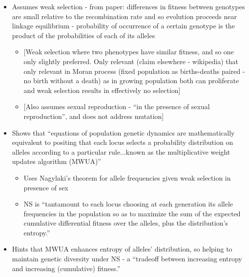 \begin{itemize}
	\item
	
	Assumes weak selection - from paper: differences in fitness between
	genotypes are small relative to the recombination rate and so
	evolution proceeds near linkage equilibrium - probability of
	occurrence of a certain genotype is the product of the probabilities
	of each of its alleles
	
	
	\begin{itemize}
		\item
		
		{[}Weak selection where two phenotypes have similar fitness, and so
		one only slightly preferred. Only relevant (claim elsewhere -
		wikipedia) that only relevant in Moran process (fixed population as
		births-deaths paired - no birth without a death) as in growing
		population both can proliferate and weak selection results in
		effectively no selection{]}
		
		\item
		
		{[}Also assumes sexual reproduction - ``in the presence of sexual
		reproduction'', and does not address mutation{]}
		
	\end{itemize}
	\item
	
	Shows that ``equations of population genetic dynamics are
	mathematically equivalent to positing that each locus selects a
	probability distribution on alleles according to a particular
	rule...known as the multiplicative weight updates algorithm (MWUA)''
	
	
	\begin{itemize}
		\item
		
		Uses Nagylaki's theorem for allele frequencies given weak selection
		in presence of sex
		
		\item
		
		NS is ``tantamount to each locus choosing at each generation its
		allele frequencies in the population so as to maximize the sum of
		the expected cumulative differential fitness over the alleles, plus
		the distribution's entropy.''
		
	\end{itemize}
	\item
	
	Hints that MWUA enhances entropy of alleles' distribution, so helping
	to maintain genetic diversity under NS - a ``tradeoff between
	increasing entropy and increasing (cumulative) fitness.''
	
\end{itemize}

